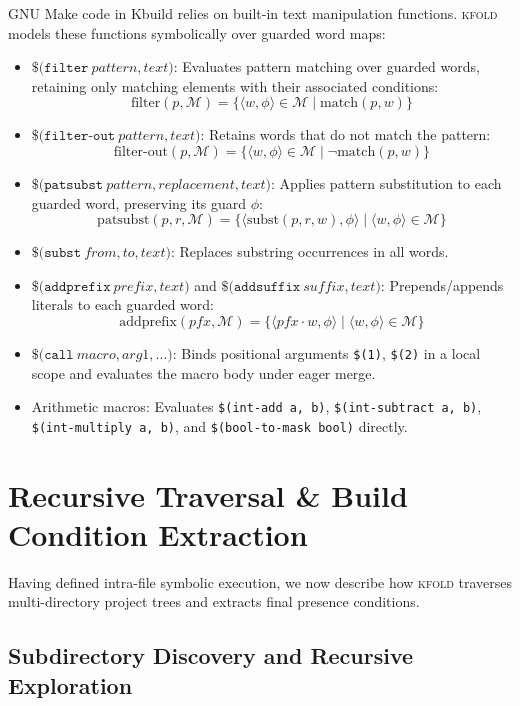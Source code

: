 \documentclass[acmsmall,screen,review]{acmart}
\newcommand{\tool}{\textsc{kfold}\xspace}
\begin{document}
GNU Make code in Kbuild relies on built-in text manipulation functions. \tool models these functions symbolically over guarded word maps:
\begin{itemize}
\item $\mathtt{\$(filter\ } pattern, text \mathtt{)}$: Evaluates pattern matching over guarded words, retaining only matching elements with their associated conditions:
$$\text{filter}(p, \mathcal{M}) = \{ \langle w, \phi \rangle \in \mathcal{M} \mid \text{match}(p, w) \}$$
\item $\mathtt{\$(filter\text{-}out\ } pattern, text \mathtt{)}$: Retains words that do not match the pattern:
$$\text{filter-out}(p, \mathcal{M}) = \{ \langle w, \phi \rangle \in \mathcal{M} \mid \neg\text{match}(p, w) \}$$
\item $\mathtt{\$(patsubst\ } pattern, replacement, text \mathtt{)}$: Applies pattern substitution to each guarded word, preserving its guard $\phi$:
$$\text{patsubst}(p, r, \mathcal{M}) = \{ \langle \text{subst}(p, r, w), \phi \rangle \mid \langle w, \phi \rangle \in \mathcal{M} \}$$
\item $\mathtt{\$(subst\ } from, to, text \mathtt{)}$: Replaces substring occurrences in all words.
\item $\mathtt{\$(addprefix\ } prefix, text \mathtt{)}$ and $\mathtt{\$(addsuffix\ } suffix, text \mathtt{)}$: Prepends/appends literals to each guarded word:
$$\text{addprefix}(pfx, \mathcal{M}) = \{ \langle pfx \cdot w, \phi \rangle \mid \langle w, \phi \rangle \in \mathcal{M} \}$$
\item $\mathtt{\$(call\ } macro, arg1, \ldots \mathtt{)}$: Binds positional arguments \texttt{\$(1)}, \texttt{\$(2)} in a local scope and evaluates the macro body under eager merge.
\item Arithmetic macros: Evaluates \texttt{\$(int-add a, b)}, \texttt{\$(int-subtract a, b)}, \texttt{\$(int-multiply a, b)}, and \texttt{\$(bool-to-mask bool)} directly.
\end{itemize}

\section{Recursive Traversal \& Build Condition Extraction}
\label{sec:traversal}

Having defined intra-file symbolic execution, we now describe how \tool traverses multi-directory project trees and extracts final presence conditions.

\subsection{Subdirectory Discovery and Recursive Exploration}
\label{sec:traversal:subdirs}
\end{document}
